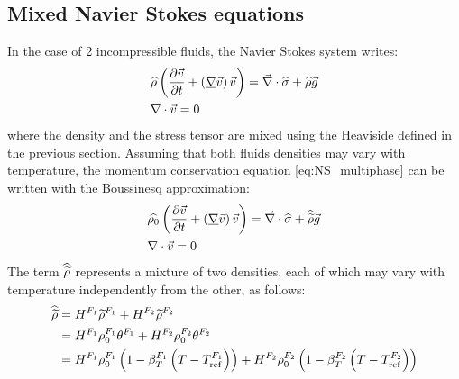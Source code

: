 \documentclass[11pt,a4paper]{article}
\begin{document}
\subsection{Mixed Navier Stokes equations}
In the case of 2 incompressible fluids, the Navier Stokes system writes: 
\begin{align}
\label{eq:NS_multiphase}
& \widehat{\rho} \left( \frac{\partial \vec{v}}{\partial t} + \left( \underline{\nabla} \vec{v} \right) \vec{v}  \right) = \vec{\nabla} \cdot \widehat{\sigma} + \widehat{\rho} \vec{g} \\ 
& \nabla \cdot \vec{v} = 0
\end{align}
where the density and the stress tensor are mixed using the Heaviside defined in the previous section.
Assuming that both fluids densities may vary with temperature, the momentum conservation equation \eqref{eq:NS_multiphase}
can be written with the Boussinesq approximation:
\begin{align}
\label{eq:NS_multiphase_boussinesq}
& \widehat{\rho_0} \left( \frac{\partial \vec{v}}{\partial t} + \left( \underline{\nabla} \vec{v} \right) \vec{v}  \right) = \vec{\nabla} \cdot \widehat{\sigma} + \widehat{\widetilde{\rho}} \vec{g} \\ 
& \nabla \cdot \vec{v} = 0
\end{align}
The term $\widehat{\widetilde{\rho}}$ represents a mixture of two densities, each of which may vary with temperature independently from the other,
as follows:
\begin{align}
\label{eq:boussinesq_mix}
\widehat{\widetilde{\rho}} &= H^{F_1} \widetilde{\rho}^{F_1} + H^{F_2} \widetilde{\rho}^{F_2} \\
				&= H^{F_1} \rho_0^{F_1} \theta^{F_1} + H^{F_2} \rho_0^{F_2} \theta^{F_2} \\
				&= H^{F_1} \rho_0^{F_1} \left( 1-\beta_T^{F_1} \left( T-T_{\text{ref}}^{F_1} \right) \right) + H^{F_2} \rho_0^{F_2} \left( 1-\beta_T^{F_2} \left( T-T_{\text{ref}}^{F_2} \right) \right)
\end{align}
\end{document}
